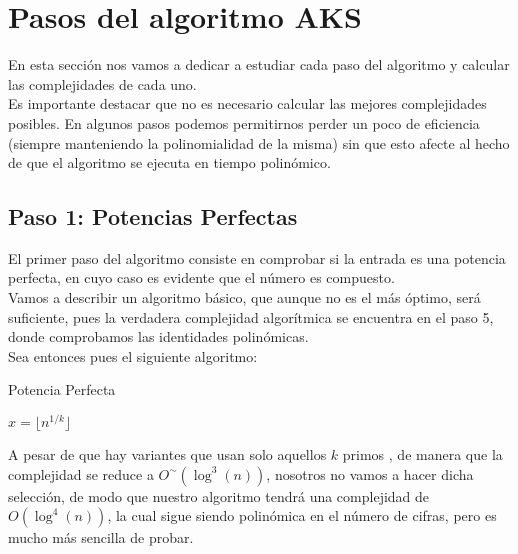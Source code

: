 \section{Pasos del algoritmo AKS}

En esta sección nos vamos a dedicar a estudiar cada paso del algoritmo y calcular las complejidades de cada uno.\\

Es importante destacar que no es necesario calcular las mejores complejidades posibles. En algunos pasos podemos permitirnos perder un poco de eficiencia (siempre manteniendo la polinomialidad de la misma) sin que esto afecte al hecho de que el algoritmo se ejecuta en tiempo polinómico.

\subsection{Paso 1: Potencias Perfectas}

El primer paso del algoritmo consiste en comprobar si la entrada es una potencia perfecta, en cuyo caso es evidente que el número es compuesto.\\

Vamos a describir un algoritmo básico, que aunque no es el más óptimo, será suficiente, pues la verdadera complejidad algorítmica se encuentra en el paso 5, donde comprobamos las identidades polinómicas.\\

Sea entonces pues el siguiente algoritmo:

\begin{algorithm}
	\caption{Potencia Perfecta}\label{perfect_power}
	\begin{algorithmic}[1]
				\State $x = \lfloor n^{1/k} \rfloor$
					\State {}
				\EndIf
			\EndFor
			\State {}
		\EndProcedure
	\end{algorithmic}
\end{algorithm}

A pesar de que hay variantes que usan solo aquellos $k$ primos \cite{bach_sorenson_1989}, de manera que la complejidad se reduce a $O^\sim(\log^3(n))$, nosotros no vamos a hacer dicha selección, de modo que nuestro algoritmo tendrá una complejidad de $O(\log^4(n))$, la cual sigue siendo polinómica en el número de cifras, pero es mucho más sencilla de probar.\\

